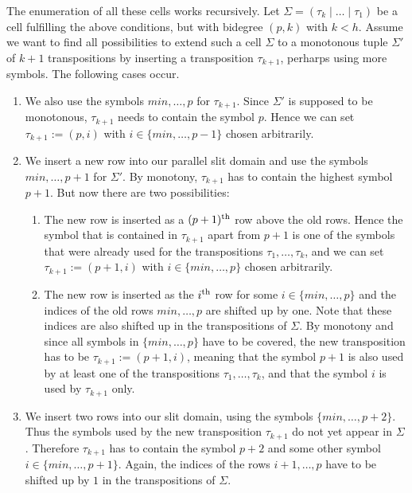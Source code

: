 The enumeration of all these cells works recursively.
Let $\Sigma = (\tau_k \mid \ldots \mid \tau_1)$ be a cell fulfilling the above conditions, 
but with bidegree $(p, k)$ with $k < h$.
Assume we want to find all possibilities to extend such a cell $\Sigma$ to a monotonous tuple $\Sigma'$ of $k+1$ transpositions
by inserting a transposition $\tau_{k + 1}$, perharps using more symbols. 
The following cases occur.

\begin{enumerate}
\item We also use the symbols $min, \dotsc, p$ for $\tau_{k+1}$.
      Since $\Sigma'$ is supposed to be monotonous, 
      $\tau_{k + 1}$ needs to contain the symbol $p$.
      Hence we can set $\tau_{k + 1} := (p, i)$ with $i \in \{min, \dotsc, p-1\}$ chosen arbitrarily.
\item We insert a new row into our parallel slit domain and use the symbols $min, \dotsc, p + 1$ for $\Sigma'$.
      By monotony, $\tau_{k + 1}$ has to contain the highest symbol $p + 1$. 
      But now there are two possibilities:
      \begin{enumerate}
      \item The new row is inserted as a $(p+1)^{\text{th}}$ row above the old rows. 
            Hence the symbol that is contained in $\tau_{k + 1}$ apart from $p + 1$
            is one of the symbols that were already used for the transpositions $\tau_1, \dotsc, \tau_k$, 
            and we can set $\tau_{k + 1} := (p + 1, i)$ with $i \in \{min, \dotsc, p\}$ chosen arbitrarily.
      \item The new row is inserted as the $i^{\text{th}}$ row for some $i \in \{min, \dotsc, p\}$  
            and the indices of the old rows $min, \dotsc, p$ are shifted up by one.
            Note that these indices are also shifted up in the transpositions of $\Sigma$.
            By monotony and since all symbols in $\{min, \dotsc, p\}$ have to be covered, 
            the new transposition has to be $\tau_{k + 1} := (p + 1, i)$, 
            meaning that the symbol $p + 1$ is also used by at least one of the transpositions $\tau_1, \dotsc, \tau_k$, 
            and that the symbol $i$ is used by $\tau_{k + 1}$ only.
      \end{enumerate}
\item We insert two rows into our slit domain, using the symbols $\{min, \dotsc, p + 2\}$. 
      Thus the symbols used by the new transposition $\tau_{k + 1}$ do not yet appear in $\Sigma$.
      Therefore $\tau_{k + 1}$ has to contain the symbol $p + 2$ and some other symbol $i \in \{min, \dotsc, p + 1\}$.
      Again, the indices of the rows $i + 1, \dotsc, p$ have to be shifted up by $1$ in the transpositions of $\Sigma$.
\end{enumerate}


